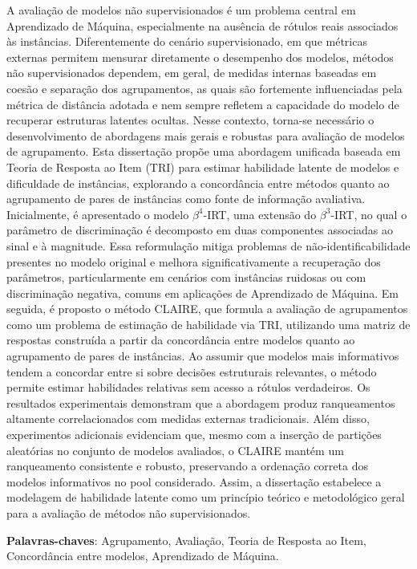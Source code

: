 
\begin{resumo}[Resumo] 
A avaliação de modelos não supervisionados é um problema central em Aprendizado de Máquina, especialmente na ausência de rótulos reais associados às instâncias. Diferentemente do cenário supervisionado, em que métricas externas permitem mensurar diretamente o desempenho dos modelos, métodos não supervisionados dependem, em geral, de medidas internas baseadas em coesão e separação dos agrupamentos, as quais são fortemente influenciadas pela métrica de distância adotada e nem sempre refletem a capacidade do modelo de recuperar estruturas latentes ocultas. Nesse contexto, torna-se necessário o desenvolvimento de abordagens mais gerais e robustas para avaliação de modelos de agrupamento. Esta dissertação propõe uma abordagem unificada baseada em Teoria de Resposta ao Item (TRI) para estimar habilidade latente de modelos e dificuldade de instâncias, explorando a concordância entre métodos quanto ao agrupamento de pares de instâncias como fonte de informação avaliativa. Inicialmente, é apresentado o modelo $\beta^4$-IRT, uma extensão do $\beta^3$-IRT, no qual o parâmetro de discriminação é decomposto em duas componentes associadas ao sinal e à magnitude. Essa reformulação mitiga problemas de não-identificabilidade presentes no modelo original e melhora significativamente a recuperação dos parâmetros, particularmente em cenários com instâncias ruidosas ou com discriminação negativa, comuns em aplicações de Aprendizado de Máquina. Em seguida, é proposto o método CLAIRE, que formula a avaliação de agrupamentos como um problema de estimação de habilidade via TRI, utilizando uma matriz de respostas construída a partir da concordância entre modelos quanto ao agrupamento de pares de instâncias. Ao assumir que modelos mais informativos tendem a concordar entre si sobre decisões estruturais relevantes, o método permite estimar habilidades relativas sem acesso a rótulos verdadeiros. Os resultados experimentais demonstram que a abordagem produz ranqueamentos altamente correlacionados com medidas externas tradicionais. Além disso, experimentos adicionais evidenciam que, mesmo com a inserção de partições aleatórias no conjunto de modelos avaliados, o CLAIRE mantém um ranqueamento consistente e robusto, preservando a ordenação correta dos modelos informativos no pool considerado. Assim, a dissertação estabelece a modelagem de habilidade latente como um princípio teórico e metodológico geral para a avaliação de métodos não supervisionados. 

 \vspace{\onelineskip}
    
 \noindent
 \textbf{Palavras-chaves}: Agrupamento, Avaliação, Teoria de Resposta ao Item, Concordância entre modelos, Aprendizado de Máquina.
\end{resumo}



